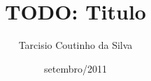 \documentclass[pt,a4paper,bsc,oneside,onehalfspacing]{risethesis}
\title{TODO: Titulo}
\date{setembro/2011}
\author{Tarcisio Coutinho da Silva}
\begin{document}
\frontmatter
\presentationpage

\mainmatter
\tableofcontents

\end{document}
